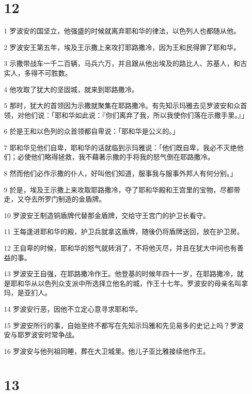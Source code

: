 \chapter{12}

\par 1 罗波安的国坚立，他强盛的时候就离弃耶和华的律法，以色列人也都随从他。
\par 2 罗波安王第五年，埃及王示撒上来攻打耶路撒冷，因为王和民得罪了耶和华。
\par 3 示撒带战车一千二百辆，马兵六万，并且跟从他出埃及的路比人、苏基人，和古实人，多得不可胜数。
\par 4 他攻取了犹大的坚固城，就来到耶路撒冷。
\par 5 那时，犹大的首领因为示撒就聚集在耶路撒冷。有先知示玛雅去见罗波安和众首领，对他们说：「耶和华如此说：『你们离弃了我，所以我使你们落在示撒手里。』」
\par 6 於是王和以色列的众首领都自卑说：「耶和华是公义的。」
\par 7 耶和华见他们自卑，耶和华的话就临到示玛雅说：「他们既自卑，我必不灭绝他们；必使他们略得拯救，我不藉著示撒的手将我的怒气倒在耶路撒冷。
\par 8 然而他们必作示撒的仆人，好叫他们知道，服事我与服事外邦人有何分别。」
\par 9 於是，埃及王示撒上来攻取耶路撒冷，夺了耶和华殿和王宫里的宝物，尽都带走，又夺去所罗门制造的金盾牌。
\par 10 罗波安王制造铜盾牌代替那金盾牌，交给守王宫门的护卫长看守。
\par 11 王每逢进耶和华的殿，护卫兵就拿这盾牌，随後仍将盾牌送回，放在护卫房。
\par 12 王自卑的时候，耶和华的怒气就转消了，不将他灭尽，并且在犹大中间也有善益的事。
\par 13 罗波安王自强，在耶路撒冷作王。他登基的时候年四十一岁，在耶路撒冷，就是耶和华从以色列众支派中所选择立他名的城，作王十七年。罗波安的母亲名叫拿玛，是亚扪人。
\par 14 罗波安行恶，因他不立定心意寻求耶和华。
\par 15 罗波安所行的事，自始至终不都写在先知示玛雅和先见易多的史记上吗？罗波安与耶罗波安时常争战。
\par 16 罗波安与他列祖同睡，葬在大卫城里。他儿子亚比雅接续他作王。

\chapter{13}

